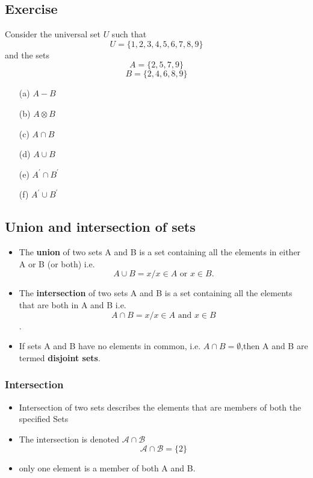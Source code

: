 \subsection*{Exercise}
Consider the universal set $U$ such that
\[U=\{1,2,3,4,5,6,7,8,9\} \] 
and the sets
\[A=\{2,5,7,9\} \] 
\[B=\{2,4,6,8,9\} \]

\begin{multicols}{2}
\begin{itemize}
	\item[(a)] $A-B$
	\item[(b)] $A \otimes B$
	\item[(c)] $A \cap B$
	\item[(d)] $A \cup B$
	\item[(e)] $A^{\prime} \cap B^{\prime}$
	\item[(f)] $A^{\prime} \cup B^{\prime}$
\end{itemize}
\end{multicols}

\newpage
\subsection*{Union and intersection of sets}

\begin{itemize}
\item The \textbf{union} of two sets A and B is a set containing all the elements in
either A or B (or both)
i.e. 
\[A \cup B = {x / x \in A \mbox{ or } x \in B}.\]
\item The \textbf{intersection} of two sets A and B is a set containing all the elements
that are both in A and B
i.e. 
\[A \cap B = {x / x \in A \mbox{ and }x \in B}\].

\item If sets A and B have no elements in common, i.e. $A \cap B = \emptyset$,then A and B
are termed \textbf{disjoint sets}.
\end{itemize}
\newpage


\subsubsection*{Intersection}
\begin{itemize}

\item Intersection of two sets describes the elements that are members of both the specified Sets

\item The intersection is denoted $\mathcal{A\cap B}$ 
\[ \mathcal{A\cap B} = \{2\}\]

\item only one element is a member of both A and B.
\end{itemize}


